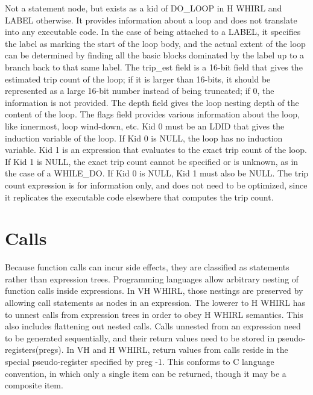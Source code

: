 \documentclass{article}
\begin{document}
\begin{itemize}
Not a statement node, but exists as a kid of 
%
DO\_LOOP in H WHIRL
and 
%
LABEL otherwise. It provides information about a loop and does
not translate into any executable code. In the case of being attached
to a 
%
LABEL, it specifies the label as marking the start of the loop
body, and the actual extent of the loop can be determined by finding
all the basic blocks
dominated by the label up to a branch back to that same label.
The trip\_est field is a 16-bit field that gives the estimated trip
count of the loop; if it is larger than 16-bits, it should be
represented as a large 16-bit number instead of being truncated; if
0, the information is not provided. The depth field gives the loop
nesting depth of the content of the loop. The flags field provides
various information about the loop, like innermost, loop wind-down,
etc. Kid 0 must be an
%
LDID that gives the induction variable of
the loop. If Kid 0 is NULL, the loop has no induction variable.
Kid 1 is an expression that evaluates to the exact trip count of         the
loop. If Kid 1 is NULL, the exact trip count cannot be specified
or is unknown, as in the case of a
%
WHILE\_DO. If Kid 0 is NULL, Kid
1 must also be NULL. The trip count expression is for information
only, and does not need to be optimized, since it replicates the
executable code elsewhere that computes the trip count.

\end{itemize}

\section{Calls}

Because function calls can incur side effects, they are classified
as statements rather than expression trees. Programming languages
allow arbitrary nesting of function calls inside expressions. In
VH WHIRL, those nestings are preserved by allowing call statements
as nodes in an expression. The lowerer to H WHIRL has to unnest
calls from expression trees in order to obey H WHIRL semantics. This
also includes flattening out nested calls. Calls unnested from an
expression need to be generated sequentially, 
and their return values need to be stored in
pseudo-registers(pregs). In VH and H WHIRL, return values from
calls reside in the special pseudo-register specified by preg -1.
This conforms to C language convention, in which only a single item
can be returned, though it may be a composite item.
\end{document}
